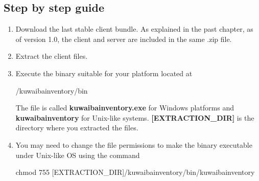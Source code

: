 \documentclass[a4paper]{article}
\begin{document}
				\subsection{Step by step guide}
					\begin{enumerate}
						\item Download the last stable client bundle. As explained in the past chapter, as of version 1.0, the client and server are included in the same .zip file.
						\item Extract the client files.
						\item Execute the binary suitable for your platform located at
						\begin{verbbox}
							/kuwaibainventory/bin
						\end{verbbox}
						\begin{figure}[ht]
							\centering	
							\theverbbox
						\end{figure}
						The file is called \textbf{kuwaibainventory.exe} for Windows platforms and \textbf{kuwaibainventory} for Unix-like systems. \textbf{[EXTRACTION\_DIR]} is the directory where you extracted the files.
						\item You may need to change the file permissions to make the binary executable under Unix-like OS using the command
						\begin{verbbox}
							chmod 755 [EXTRACTION_DIR]/kuwaibainventory/bin/kuwaibainventory
						\end{verbbox}
						\begin{figure}[ht]
							\centering	
							\theverbbox
						\end{figure}	
						
					\end{enumerate}
\end{document}
